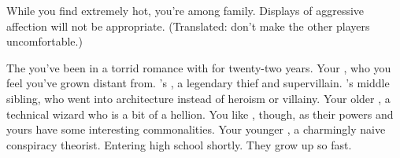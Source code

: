\documentclass[char]{LRSguildcamp1}
\begin{document}
\begin{itemz}[Notes]
	\item While you find \cOS{} extremely hot, you're among family.  Displays of aggressive affection will not be appropriate.  (Translated: don't make the other players uncomfortable.)
\end{itemz}

\begin{contacts}
	\contact{\cOldest{}}  The \cOldest{\villain} you've been in a torrid romance with for twenty-two years.
	\contact{\cGrad{}} Your \cGrad{\offspring}, who you feel you've grown distant from.
	\contact{\cGrandma{}} \cOldest{}'s \cGrandma{\parent}, a legendary thief and supervillain.
	\contact{\cArchitect{}} \cOldest{}'s middle sibling, who went into architecture instead of heroism or villainy. 
	\contact{\cTeen{}} Your older \cTeen{\nephew}, a technical wizard who is a bit of a hellion.  You like \cTeen{\them}, though, as their powers and yours have some interesting commonalities.
	\contact{\cTween{}} Your younger \cTween{\nephew}, a charmingly naive conspiracy theorist.  Entering high school shortly.  They grow up so fast.
\end{contacts}
\end{document}
